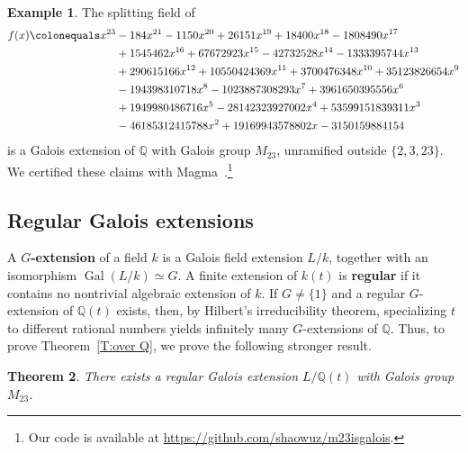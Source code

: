 \documentclass[12pt,reqno]{amsart}
\newcommand{\deficolor}{ForestGreen}
\newcommand{\defi}[1]{\textbf{\color{\deficolor} #1}} %
\newcommand{\Q}{\mathbb{Q}}
\DeclareMathOperator{\Gal}{Gal}
\newcommand{\isom}{\simeq}
\newtheorem{theorem}{Theorem}[section]
\theoremstyle{definition}
\newtheorem{example}[theorem]{Example}
\theoremstyle{remark}
\begin{document}
\begin{example}
\label{Ex:M23 over Q}
The splitting field of 
\begin{align*}
    f(x) \colonequals x^{23} &- 184 x^{21} - 1150 x^{20} + 26151 x^{19} + 18400 x^{18} - 1808490 x^{17} \\
      &+ 1545462 x^{16} + 67672923 x^{15} - 42732528 x^{14} - 1333395744 x^{13} \\
      &+ 290615166 x^{12} + 10550424369 x^{11} + 3700476348 x^{10} + 35123826654 x^9 \\
      &- 194398310718 x^8 - 1023887308293 x^7 + 3961650395556 x^6 \\
      &+ 1949980486716 x^5 - 28142323927002 x^4 + 53599151839311 x^3 \\
      &- 46185312415788 x^2 + 19169943578802 x - 3150159884154
\end{align*}
is a Galois extension of $\Q$ with Galois group $M_{23}$, unramified outside $\{2,3,23\}$. We certified these claims with Magma~\cite{Magma}.\footnote{Our code is available at \url{https://github.com/shaowuz/m23isgalois}.}
\end{example}



\subsection{Regular Galois extensions}

A \defi{$G$-extension} of a field $k$ is a Galois field extension $L/k$, together with an isomorphism 
$\Gal(L/k) \isom G$.
A finite extension of $k(t)$ is \defi{regular} if it contains no nontrivial algebraic extension of $k$.
If $G \ne \{1\}$ and a regular $G$-extension of $\Q(t)$ exists,
then, by Hilbert's irreducibility theorem, 
specializing $t$ to different rational numbers yields infinitely many $G$-extensions of $\Q$.
Thus, to prove Theorem~\ref{T:over Q}, we prove the following stronger result. 

\begin{theorem}
\label{T:over Q(t)}
There exists a regular Galois extension $L/\Q(t)$ with Galois group $M_{23}$.
\end{theorem}
\end{document}
